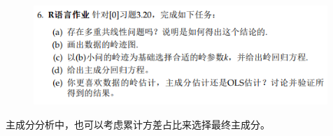 \documentclass[cn,hazy,green,12pt,normal]{elegantnote}
\numberwithin{equation}{section}
\numberwithin{subsection}{section}
\begin{document}
\newpage

\begin{homework}   
\end{homework}
\begin{figure}[!htbp]
    \centering
    \includegraphics[width=30em]{image/hw5_6.png}
\end{figure}

\begin{note}
    主成分分析中，也可以考虑累计方差占比来选择最终主成分。
\end{note}
\end{document}

